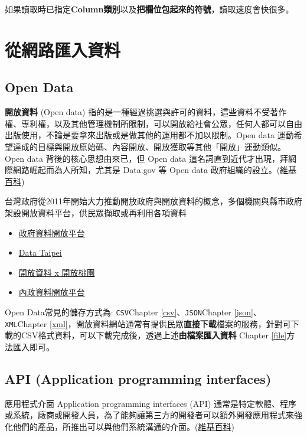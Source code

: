 \documentclass[]{book}
\providecommand{\tightlist}{%
  \setlength{\itemsep}{0pt}\setlength{\parskip}{0pt}}
\theoremstyle{definition}
\theoremstyle{definition}
\theoremstyle{remark}
\begin{document}
如果讀取時已指定\textbf{Column類別}以及\textbf{把欄位包起來的符號}，讀取速度會快很多。

\section{從網路匯入資料}

\subsection{Open Data}\label{open-data}

\textbf{開放資料} (Open data)
指的是一種經過挑選與許可的資料，這些資料不受著作權、專利權，以及其他管理機制所限制，可以開放給社會公眾，任何人都可以自由出版使用，不論是要拿來出版或是做其他的運用都不加以限制。Open
data
運動希望達成的目標與開放原始碼、內容開放、開放獲取等其他「開放」運動類似。Open
data 背後的核心思想由來已，但 Open data
這名詞直到近代才出現，拜網際網路崛起而為人所知，尤其是 Data.gov 等 Open
data
政府組織的設立。(\href{https://zh.wikipedia.org/wiki/\%E9\%96\%8B\%E6\%94\%BE\%E8\%B3\%87\%E6\%96\%99}{維基百科})

台灣政府從2011年開始大力推動開放政府與開放資料的概念，多個機關與縣市政府架設開放資料平台，供民眾擷取或再利用各項資料

\begin{itemize}
\tightlist
\item
  \href{http://data.gov.tw/}{政府資料開放平台}
\item
  \href{http://data.taipei/}{Data Taipei}
\item
  \href{http://data.tycg.gov.tw/}{開放資料 x 開放桃園}
\item
  \href{http://data.moi.gov.tw/}{內政資料開放平台}
\end{itemize}

Open Data常見的儲存方式為: \texttt{CSV}Chapter
\ref{csv}、\texttt{JSON}Chapter \ref{json}、\texttt{XML}Chapter
\ref{xml}，開放資料網站通常有提供民眾\textbf{直接下載}檔案的服務，針對可下載的CSV格式資料，可以下載完成後，透過上述\textbf{由檔案匯入資料}
Chapter \ref{file}方法匯入即可。

\subsection{API (Application programming interfaces)}\label{api}

應用程式介面 Application programming interfaces (API)
通常是特定軟體、程序或系統，廠商或開發人員，為了能夠讓第三方的開發者可以額外開發應用程式來強化他們的產品，所推出可以與他們系統溝通的介面。(\href{https://zh.wikipedia.org/zh-tw/\%E5\%BA\%94\%E7\%94\%A8\%E7\%A8\%8B\%E5\%BA\%8F\%E6\%8E\%A5\%E5\%8F\%A3}{維基百科})
\end{document}
